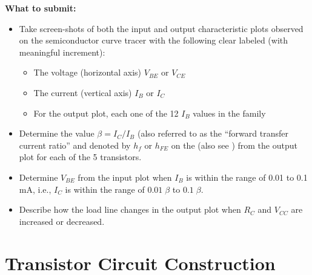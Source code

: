 {\bf What to submit:}

\begin{itemize}
\item Take screen-shots of both the input and output characteristic plots 
  observed on the semiconductor curve tracer with the following clear 
  labeled (with meaningful increment):
  \begin{itemize}
  \item The voltage (horizontal axis) $V_{BE}$ or $V_{CE}$
  \item The current (vertical axis) $I_B$ or $I_C$
  \item For the output plot, each one of the 12 $I_B$ values in the family
  \end{itemize}
\item Determine the value $\beta=I_C/I_B$ (also referred to as the 
  ``forward transfer current ratio'' and denoted by $h_f$ or $h_{FE}$ on
  the 
  (also see )
  from the output plot for each of the 5 transistors.
\item Determine $V_{BE}$ from the input plot when $I_B$ is within the range of
  0.01 to 0.1 mA, i.e., $I_C$ is within the range of $0.01\;\beta$ to $0.1\;\beta$.
\item Describe how the load line changes in the output plot when $R_C$ and $V_{CC}$
  are increased or decreased.
\end{itemize}


\section{Transistor Circuit Construction}


